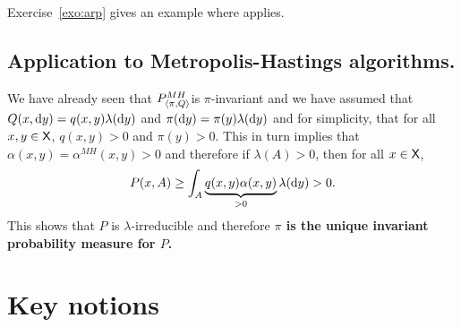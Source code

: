 \documentclass[english,graybox,envcountchap,envcountsame,sectrefs,shortlabels]{svmono}
\theoremstyle{style}
\begin{document}
Exercise~\ref{exo:arp} gives an example where  applies.
\subsection{\label{subsec:MH:uniq}Application to Metropolis-Hastings algorithms. }

We have already seen that $P_{\langle\pi,Q\rangle}^{MH}$is $\pi$-invariant and we
have assumed that $Q(x,\mathrm{d} y)=q(x,y)\lambda(\mathrm{d} y)$ and $\pi(\mathrm{d} y)=\pi(y)\lambda(\mathrm{d} y)$
and for simplicity, that for all $x,y\in\mathsf{X}$, $q(x,y)>0$
and $\pi(y)>0$. This in turn implies that $\alpha(x,y)=\alpha^{MH}(x,y)>0$
and therefore if $\lambda(A)>0$, then for all $x\in\mathsf{X}$,
\[
P(x,A)\geq\int_{A}\underbrace{q(x,y)\alpha(x,y)}_{>0}\lambda(\mathrm{d} y)>0.
\]
This shows that $P$ is $\lambda$-irreducible and therefore \textbf{$\pi$
is the unique invariant probability measure for $P$.}

\section{Key notions}
\begin{center}
\end{center}
\end{document}
